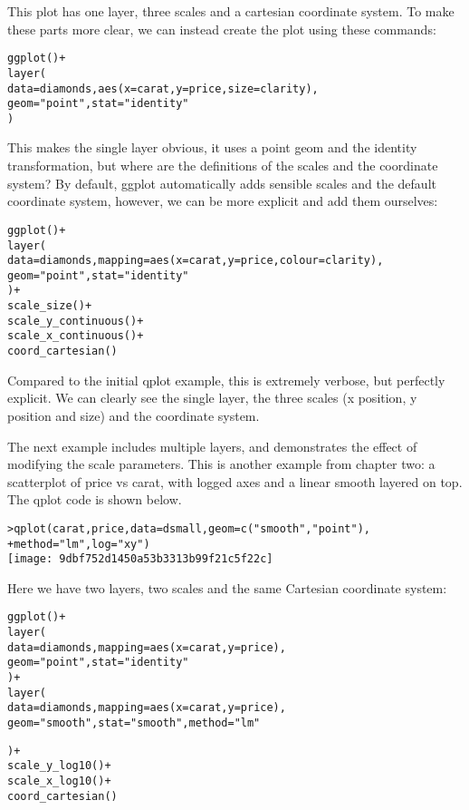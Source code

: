 This plot has one layer, three scales and a cartesian coordinate system.  To make these parts more clear, we can instead create the plot using these commands:

\begin{alltt}
ggplot() + 
layer(
  data = diamonds, aes(x = carat, y = price, size = clarity),
  geom = "point", stat = "identity"
)
\end{alltt}

This makes the single layer obvious, it uses a point geom and the identity transformation, but where are the definitions of the scales and the coordinate system?  By default, ggplot automatically adds sensible scales and the default coordinate system, however, we can be more explicit and add them ourselves:

\begin{alltt}
ggplot() + 
layer(
  data = diamonds, mapping = aes(x = carat, y = price, colour = clarity),
  geom = "point", stat = "identity"
) + 
scale_size() + 
scale_y_continuous() + 
scale_x_continuous() + 
coord_cartesian()
\end{alltt}

Compared to the initial qplot example, this is extremely verbose, but perfectly explicit.  We  can clearly see the single layer, the three scales (x position, y position and size) and the coordinate system.  

The next example includes multiple layers, and demonstrates the effect of modifying the scale parameters.  This is another example from chapter two: a scatterplot of price vs carat, with logged axes and a linear smooth layered on top.  The qplot code is shown below.

\begin{alltt}
> qplot(carat, price, data = dsmall, geom = c("smooth", "point"), 
+     method = "lm", log = "xy")
\texttt{[image: 9dbf752d1450a53b3313b99f21c5f22c]}

\end{alltt}

Here we have two layers, two scales and the same Cartesian coordinate system:

\begin{alltt}
ggplot() + 
layer(
  data = diamonds, mapping = aes(x = carat, y = price),
  geom = "point", stat = "identity"
) + 
layer(
  data = diamonds, mapping = aes(x = carat, y = price),
  geom = "smooth", stat = "smooth", method = "lm"
  
) + 
scale_y_log10() + 
scale_x_log10() + 
coord_cartesian()
\end{alltt}

